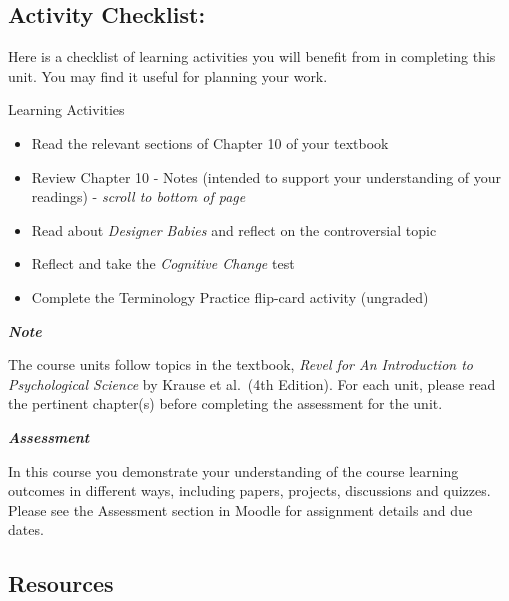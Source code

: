 \documentclass[
]{book}
\providecommand{\tightlist}{%
  \setlength{\itemsep}{0pt}\setlength{\parskip}{0pt}}
\begin{document}
\hypertarget{activity-checklist-2}{%
\subsection*{Activity Checklist:}\label{activity-checklist-2}}

Here is a checklist of learning activities you will benefit from in completing this unit. You may find it useful for planning your work.

\begin{reflect}
{Learning Activities}

\begin{itemize}
\tightlist
\item
  Read the relevant sections of Chapter 10 of your textbook
\item
  Review Chapter 10 - Notes (intended to support your understanding of your readings) - \emph{scroll to bottom of page}
\item
  Read about \emph{Designer Babies} and reflect on the controversial topic
\item
  Reflect and take the \emph{Cognitive Change} test
\item
  Complete the Terminology Practice flip-card activity (ungraded)
\end{itemize}
\end{reflect}

\begin{caution}
\textbf{\emph{Note}}

The course units follow topics in the textbook, \emph{Revel for An Introduction to Psychological Science} by Krause et al.~(4th Edition). For each unit, please read the pertinent chapter(s) before completing the assessment for the unit.
\end{caution}

\begin{assessment}
\textbf{\emph{Assessment}}

In this course you demonstrate your understanding of the course learning outcomes in different ways, including papers, projects, discussions and quizzes. Please see the Assessment section in Moodle for assignment details and due dates.
\end{assessment}

\hypertarget{resources-2}{%
\subsection*{Resources}\label{resources-2}}
\end{document}
